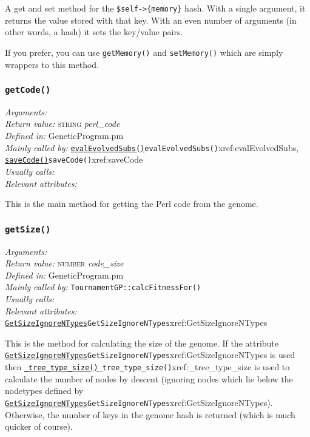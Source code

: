 \documentclass[a4paper]{article}
\begin{document}
A get and set method for the \verb:$self->{memory}: %
hash.  With a single argument, it returns the value
stored with that key.  With an even number of arguments
(in other words, a hash) it sets the key/value pairs.

If you prefer, you can use \texttt{getMemory()} and
\texttt{setMemory()} which are simply wrappers to this method.

\subsubsection{\texttt{getCode()}}\label{xref:getCode}
\begin{flushleft}
\textit{Arguments:} \\
\textit{Return value:} \textsc{string} \textit{perl\_code}\\
\textit{Defined in:} GeneticProgram.pm\\
\textit{Mainly called by:} \hyperref[no]{\texttt{evalEvolvedSubs()}}{\texttt{evalEvolvedSubs()}}{xref:evalEvolvedSubs}, \hyperref[no]{\texttt{saveCode()}}{\texttt{saveCode()}}{xref:saveCode}\\
\textit{Usually calls:} \\
\textit{Relevant attributes:}
\end{flushleft}

This is the main method for getting the Perl code from the genome.  

\subsubsection{\texttt{getSize()}}\label{xref:getSize}
\begin{flushleft}
\textit{Arguments:} \\
\textit{Return value:} \textsc{number} \textit{code\_size}\\
\textit{Defined in:} GeneticProgram.pm\\
\textit{Mainly called by:} \texttt{TournamentGP::calcFitnessFor()}\\
\textit{Usually calls:} \\
\textit{Relevant attributes:} \hyperref[no]{\texttt{GetSizeIgnoreNTypes}}{\texttt{GetSizeIgnoreNTypes}}{xref:GetSizeIgnoreNTypes}
\end{flushleft}

This is the method for calculating the size of the genome.  If the
attribute \hyperref[no]{\texttt{GetSizeIgnoreNTypes}}{\texttt{GetSizeIgnoreNTypes}}{xref:GetSizeIgnoreNTypes} is used then
\hyperref[no]{\texttt{\_tree\_type\_size()}}{\texttt{\_tree\_type\_size()}}{xref:_tree_type_size} is used to calculate the number of nodes
by descent (ignoring nodes which lie below the nodetypes defined by
\hyperref[no]{\texttt{GetSizeIgnoreNTypes}}{\texttt{GetSizeIgnoreNTypes}}{xref:GetSizeIgnoreNTypes}).  Otherwise, the number of keys in the
genome hash is returned (which is much quicker of course).
\end{document}
